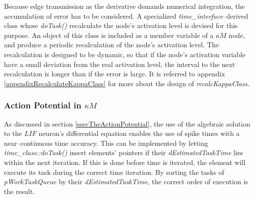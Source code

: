 		Because edge transmission as the derivative demands numerical integration, the accumulation of error has to be considered.
		A specialized \emph{time\_interface}--derived class whose \emph{doTask()} recalculate the node's activation level is devised for this purpose.
		An object of this class is included as a member variable of a $\kappa M$ node, and produce a periodic recalculation of the node's activation level.
		The recalculation is designed to be dynamic, so that if the node's activation variable have a small deviation from the real activation level, the interval to the next recalculation is longer than if the error is large.
		It is referred to appendix \ref{appendixRecalculateKappaClass} for more about the design of \emph{recalcKappaClass}.
		
		
		



		\subsubsection{Action Potential in $\kappa M$}

		As discussed in section \ref{ssecTheActionPotential}, the use of the algebraic solution to the $LIF$ neuron's differential equation enables the use of spike times with a near--continuous time accuracy.
		This can be implemented by letting \emph{time\_class::doTask()} insert elements' pointers if their \emph{dEstimatedTaskTime} lies within the next iteration.
		If this is done before time is iterated, the element will execute its task during the correct time iteration.
		By sorting the tasks of \emph{pWorkTaskQueue} by their \emph{dEstimatedTaskTime}, the correct order of execution is the result.


